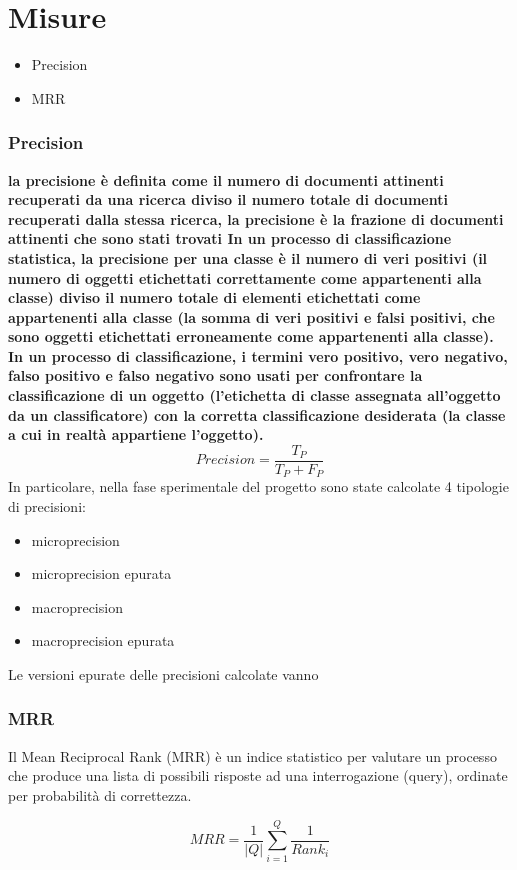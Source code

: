 \section{Misure}
\begin{itemize}
\item Precision
\item MRR
\end{itemize}
\subsubsection{Precision}
\textbf{la precisione è definita come il numero di documenti attinenti recuperati da una ricerca diviso il numero totale di documenti recuperati dalla stessa ricerca,
la precisione è la frazione di documenti attinenti che sono stati trovati
In un processo di classificazione statistica, la precisione per una classe è il numero di veri positivi (il numero di oggetti etichettati correttamente come appartenenti alla classe) diviso il numero totale di elementi etichettati come appartenenti alla classe (la somma di veri positivi e falsi positivi, che sono oggetti etichettati erroneamente come appartenenti alla classe).
In un processo di classificazione, i termini vero positivo, vero negativo, falso positivo e falso negativo sono usati per confrontare la classificazione di un oggetto (l’etichetta di classe assegnata all’oggetto da un classificatore) con la corretta classificazione desiderata (la classe a cui in realtà appartiene l’oggetto).}
$$
Precision =\frac{T_P}{T_P+F_P}
$$
In particolare, nella fase sperimentale del progetto sono state calcolate 4 tipologie di precisioni:
\begin{itemize}
\item microprecision
\item microprecision epurata
\item macroprecision
\item macroprecision epurata
\end{itemize}
Le versioni epurate delle precisioni calcolate vanno
\subsubsection{MRR}
Il Mean Reciprocal Rank (MRR) è un indice statistico per valutare un processo che produce una lista di possibili risposte ad una interrogazione (query), ordinate per probabilità di correttezza.

\begin{equation}
MRR = \frac{1}{|Q|}\sum_{i=1}^{Q}{\frac{1}{Rank_i}}
\end{equation}

